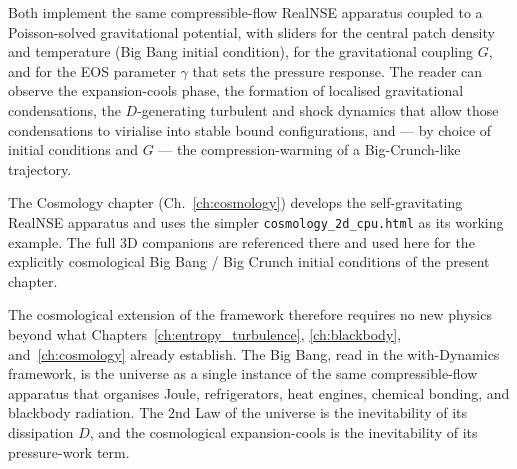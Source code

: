 Both implement the same compressible-flow RealNSE apparatus coupled to a
Poisson-solved gravitational potential, with sliders for the central
patch density and temperature (Big Bang initial condition), for the
gravitational coupling $G$, and for the EOS parameter $\gamma$ that
sets the pressure response. The reader can observe the expansion-cools
phase, the formation of localised gravitational condensations, the
$D$-generating turbulent and shock dynamics that allow those
condensations to virialise into stable bound configurations, and ---
by choice of initial conditions and $G$ --- the compression-warming
of a Big-Crunch-like trajectory.

The Cosmology chapter (Ch.~\ref{ch:cosmology}) develops the
self-gravitating RealNSE apparatus and uses the simpler
\texttt{cosmology\_2d\_cpu.html} as its working example. The full 3D
companions are referenced there and used here for the explicitly
cosmological Big Bang / Big Crunch initial conditions of the present
chapter.

The cosmological extension of the framework therefore requires no new
physics beyond what Chapters~\ref{ch:entropy_turbulence},
\ref{ch:blackbody}, and~\ref{ch:cosmology} already establish. The
Big Bang, read in the with-Dynamics framework, is the universe as a
single instance of the same compressible-flow apparatus that
organises Joule, refrigerators, heat engines, chemical bonding, and
blackbody radiation. The 2nd Law of the universe is the inevitability
of its dissipation $D$, and the cosmological expansion-cools is the
inevitability of its pressure-work term.
